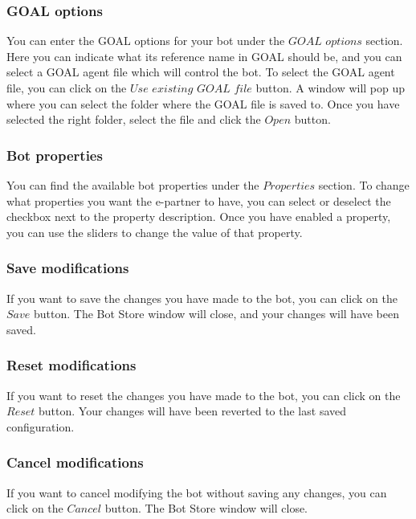 \documentclass[11pt,a4paper]{article}
\begin{document}
\subsubsection{GOAL options}
You can enter the GOAL options for your bot under the $GOAL$ $options$ section. Here you can indicate what its reference name in GOAL should be, and you can select a GOAL agent file which will control the bot. To select the GOAL agent file, you can click on the $Use$ $existing$ $GOAL$ $file$ button. A window will pop up where you can select the folder where the GOAL file is saved to. Once you have selected the right folder, select the file and click the $Open$ button.

\subsubsection{Bot properties}
You can find the available bot properties under the $Properties$ section. To change what properties you want the e-partner to have, you can select or deselect the checkbox next to the property description. Once you have enabled a property, you can use the sliders to change the value of that property.

\subsubsection{Save modifications}
If you want to save the changes you have made to the bot, you can click on the $Save$ button. The Bot Store window will close, and your changes will have been saved.

\subsubsection{Reset modifications}
If you want to reset the changes you have made to the bot, you can click on the $Reset$ button. Your changes will have been reverted to the last saved configuration.

\subsubsection{Cancel modifications}
If you want to cancel modifying the bot without saving any changes, you can click on the $Cancel$ button. The Bot Store window will close.
\end{document}
